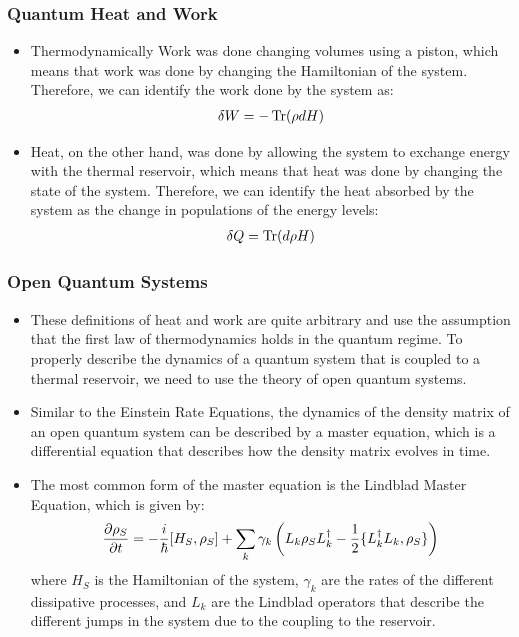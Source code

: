 \documentclass{beamer}
\begin{document}
    \begin{frame}
        \frametitle{Quantum Heat and Work}
        \begin{itemize}
            \item Thermodynamically Work was done changing volumes using a piston, which means that work was done by changing the Hamiltonian of the system. Therefore, we can identify the work done by the system as:
            \begin{align*}
                \delta W = -\Tr(\rho dH)
            \end{align*} \pause
            \item Heat, on the other hand, was done by allowing the system to exchange energy with the thermal reservoir, which means that heat was done by changing the state of the system. Therefore, we can identify the heat absorbed by the system as the change in populations of the energy levels:
            \begin{align*}
                \delta Q = \Tr(d\rho H)
            \end{align*}
            \end{itemize}
    \end{frame}
    \begin{frame}
        \frametitle{Open Quantum Systems}
        \begin{itemize}
            \item These definitions of heat and work are quite arbitrary and use the assumption that the first law of thermodynamics holds in the quantum regime. To properly describe the dynamics of a quantum system that is coupled to a thermal reservoir, we need to use the theory of open quantum systems. \pause
            \item Similar to the Einstein Rate Equations, the dynamics of the density matrix of an open quantum system can be described by a master equation, which is a differential equation that describes how the density matrix evolves in time. \pause
            \item The most common form of the master equation is the Lindblad Master Equation, which is given by:
            \begin{align*}
                \pdv{\rho_S}{t} = -\frac{i}{\hbar}[H_S, \rho_S] + \sum_{k} \gamma_k \left( L_k \rho_S L_k^{\dagger} - \frac{1}{2} \{L_k^{\dagger} L_k, \rho_S\} \right)
            \end{align*}
             where $H_S$ is the Hamiltonian of the system, $\gamma_k$ are the rates of the different dissipative processes, and $L_k$ are the Lindblad operators that describe the different jumps in the system due to the coupling to the reservoir. 

        \end{itemize}
    \end{frame}
\end{document}
